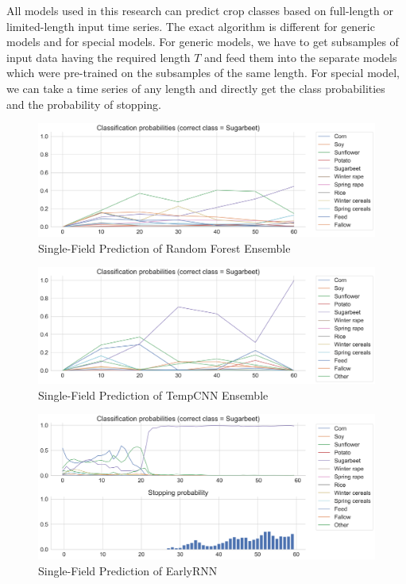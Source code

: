 \documentclass{article}
\begin{document}
All models used in this research can predict crop classes based on full-length or limited-length input time series. The exact algorithm is different for generic models and for special models. For generic models, we have to get subsamples of input data having the required length $T$ and feed them into the separate models which were pre-trained on the subsamples of the same length. For special model, we can take a time series of any length and directly get the class probabilities and the probability of stopping.


\begin{figure}
    \centering
    \includegraphics[width=\textwidth]{images/rf_preds.png}
    \caption{Single-Field Prediction of Random Forest Ensemble}
    \label{Figure 4.3.1}
\end{figure}


\begin{figure}
    \centering
    \includegraphics[width=\textwidth]{images/tempcnn_preds.png}
    \caption{Single-Field Prediction of TempCNN Ensemble}
    \label{Figure 4.3.2}
\end{figure}


\begin{figure}
    \centering
    \includegraphics[width=\textwidth]{images/earlyrnn_preds.png}
    \caption{Single-Field Prediction of EarlyRNN}
    \label{Figure 4.3.3}
\end{figure}
\end{document}
